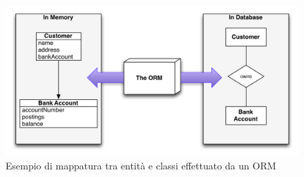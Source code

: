 \documentclass[\main/Tesi.tex]{subfiles}
\begin{document}
\begin{figure}[h]
\caption{Esempio di mappatura tra entità e classi effettuato da un ORM}
\includegraphics[width=\textwidth]{../images/orm.png}
\end{figure}
\end{document}

